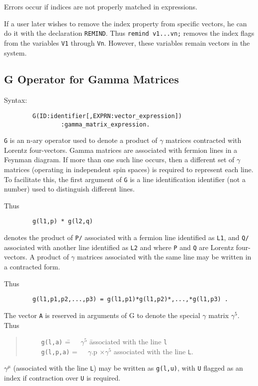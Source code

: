 Errors occur if indices are not properly matched in expressions.

If a user later wishes to remove the index property from specific vectors,
he can do it with the declaration {\tt REMIND}. Thus
{\tt remind v1...vn;} removes the index flags from the variables {\tt V1}
through {\tt Vn}.  However, these variables remain vectors in the system.

\subsection{G Operator for Gamma Matrices}  

Syntax:
\begin{verbatim}
        G(ID:identifier[,EXPRN:vector_expression])
                :gamma_matrix_expression.
\end{verbatim}
{\tt G} is an n-ary operator used to denote a product of $\gamma$ matrices
contracted with Lorentz four-vectors. Gamma matrices are associated with
fermion lines in a Feynman diagram. If more than one such line occurs,
then a different set of $\gamma$ matrices (operating in independent spin
spaces) is required to represent each line. To facilitate this, the first
argument of {\tt G} is a line identification identifier (not a number)
used to distinguish different lines.

Thus
\begin{verbatim}
        g(l1,p) * g(l2,q)
\end{verbatim}
denotes the product of {\tt P/} associated with a fermion line identified as
{\tt L1}, and {\tt Q/} associated with another line identified as {\tt L2} and
where {\tt P} and {\tt Q} are Lorentz four-vectors.  A product of $\gamma$
matrices associated with the same line may be written in a contracted
form.

Thus
\begin{verbatim}
        g(l1,p1,p2,...,p3) = g(l1,p1)*g(l1,p2)*,...,*g(l1,p3) .
\end{verbatim}
The vector {\tt A} is reserved in arguments of G to denote the special
$\gamma$ matrix $\gamma^{5}$. Thus
\begin{quote}
\begin{tabbing}
\ \ \ \ \ {\tt g(l,a)}\hspace{0.2in} \= =\ \ \  $\gamma^{5}$ \hspace{0.5in}
\= associated with the line {\tt l} \\[0.1in]
\ \ \ \ \ {\tt g(l,p,a)} \> =\ \ \  $\gamma$.p $\times \gamma^{5}$ \>
associated with the line {\tt L}.
\end{tabbing}
\end{quote}
$\gamma^{\mu}$ (associated with the line {\tt L}) may be written as
{\tt g(l,u)}, with {\tt U} flagged as an index if contraction over {\tt U}
is required.


